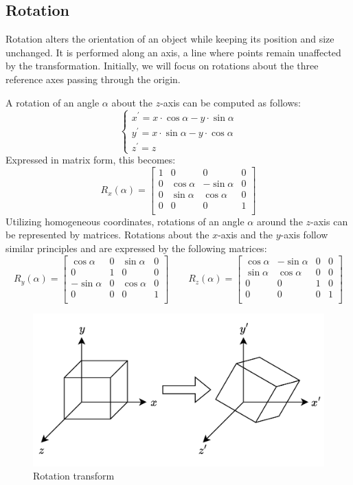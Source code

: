 \subsection{Rotation}
Rotation alters the orientation of an object while keeping its position and size unchanged.
It is performed along an axis, a line where points remain unaffected by the transformation.
Initially, we will focus on rotations about the three reference axes passing through the origin.

A rotation of an angle $\alpha$ about the $z$-axis can be computed as follows:
\[\begin{cases}
    x^\prime = x \cdot \cos \alpha - y \cdot \sin \alpha \\
    y^\prime = x \cdot \sin \alpha - y \cdot \cos \alpha \\
    z^\prime = z
\end{cases}\]
Expressed in matrix form, this becomes:
\[R_x(\alpha)=
\begin{bmatrix}
    1 & 0   & 0   & 0 \\
    0   & \cos \alpha & - \sin \alpha   & 0 \\
    0   & \sin \alpha   & \cos \alpha & 0 \\
    0   & 0   & 0   & 1 \\
\end{bmatrix}\]
Utilizing homogeneous coordinates, rotations of an angle $\alpha$ around the $z$-axis can be represented by matrices.
Rotations about the $x$-axis and the $y$-axis follow similar principles and are expressed by the following matrices:
\[R_y(\alpha)=
\begin{bmatrix}
    \cos \alpha & 0   & \sin \alpha   & 0 \\
    0   & 1 & 0 & 0 \\
    -\sin \alpha  & 0   & \cos \alpha & 0 \\
    0   & 0   & 0   & 1 \\
\end{bmatrix} 
\qquad 
R_z(\alpha)=
\begin{bmatrix}
    \cos \alpha & -\sin \alpha  & 0   & 0 \\
    \sin \alpha   & \cos \alpha & 0 & 0 \\
    0  & 0   & 1 & 0 \\
    0   & 0   & 0   & 1 \\
\end{bmatrix}\]

\begin{figure}[H]
    \centering
    \includegraphics[width=0.64\linewidth]{images/rotation.png}
    \caption{Rotation transform}
\end{figure}

